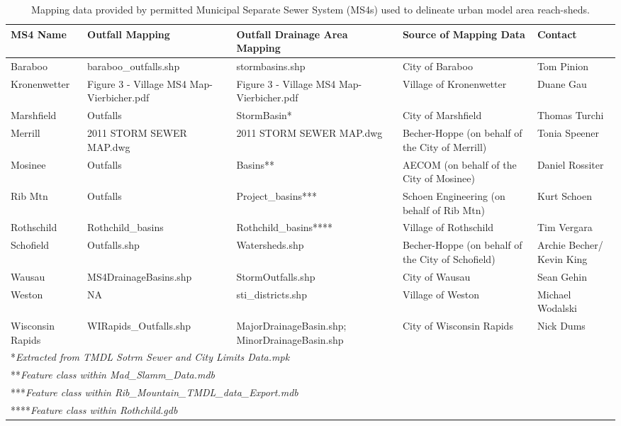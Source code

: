 \begin{landscape}
\begin{table}
\begin{center}
	\caption[Mapping data provided by permitted Municipal Separate Sewer System]{Mapping data provided by permitted Municipal Separate Sewer System (MS4s) used to delineate urban model area reach-sheds.}
	\begin{tabular}{l p{3.5cm} p{3.5cm} p{4cm} p{3cm}}
	\hline
	MS4 Name	&	Outfall Mapping	&	Outfall Drainage Area Mapping	&	Source of Mapping Data	&	Contact	\\
	\hline	\hline
Baraboo 	 	 	& 	 	baraboo\_outfalls.shp	 	 & 	 	stormbasins.shp	 	 & 	 	City of Baraboo 	 	 & 	 	Tom Pinion \\ [0.25ex]
Kronenwetter	 	 & 	 	Figure 3 - Village MS4 Map-Vierbicher.pdf	 	 & 	 	Figure 3 - Village MS4 Map-Vierbicher.pdf	 	 & 	 	Village of Kronenwetter	 	 & 	 	Duane Gau \\[0.25ex]
Marshfield 	 	 & 	 	Outfalls  	 	 	& 	 	StormBasin*	 	 & 	 	City of Marshfield	 	 & 	 	Thomas Turchi \\[0.25ex]
Merrill 	 	 & 	 	2011 STORM SEWER MAP.dwg	 	 & 	 	2011 STORM SEWER MAP.dwg	 	 & 	 	Becher-Hoppe (on behalf of the City of Merrill)	 	 & 	 	Tonia Speener \\[0.25ex]
Mosinee	 	 	& 	 	Outfalls 	 	 	& 	 	Basins**	 	 & 	 	AECOM (on behalf of the City of Mosinee)	 	 & 	 	Daniel Rossiter \\[0.25ex]
Rib Mtn	 	 	& 	 	Outfalls 	 	 	& 	 	Project\_basins***	 	 & 	 	Schoen Engineering (on behalf of Rib Mtn)	 	 & 	 	Kurt Schoen \\[0.25ex]
Rothschild	 	 & 	 	Rothchild\_basins	 	 & 	 	Rothchild\_basins****	 	 & 	 	Village of Rothschild	 	 & 	 	Tim Vergara \\[0.25ex]
Schofield	 	 & 	 	Outfalls.shp	 	 & 	 	Watersheds.shp	 	 & 	 	Becher-Hoppe (on behalf of the City of Schofield)	 	 & 	 	Archie Becher/ Kevin King \\[0.25ex]
Wausau	 	 	& 	 	MS4DrainageBasins.shp	 	 & 	 	StormOutfalls.shp	 	 & 	 	City of Wausau 	 	 & 	 	Sean Gehin \\[0.25ex]
Weston	 	 	& 	 	NA	 	 			& 	 	sti\_districts.shp	 	 & 	 	Village of Weston	 	 & 	 	Michael Wodalski \\[0.25ex]
Wisconsin Rapids	 						 & 	 	WIRapids\_Outfalls.shp	 	 & 	 	MajorDrainageBasin.shp; MinorDrainageBasin.shp	 	 & 	 	City of Wisconsin Rapids	 	 & 	 	Nick Dums \\[0.25ex]
		\hline
		\multicolumn{5}{l}{*\textit{Extracted from TMDL Sotrm Sewer and City Limits Data.mpk}} \\
		\multicolumn{5}{l}{**\textit{Feature class within Mad\_Slamm\_Data.mdb}} \\
		\multicolumn{5}{l}{***\textit{Feature class within Rib\_Mountain\_TMDL\_data\_Export.mdb}} \\
		\multicolumn{5}{l}{****\textit{Feature class within Rothchild.gdb}} \\
	\end{tabular}
\label{tab:reachshed_data}
\end{center}
\end{table}
\end{landscape}

